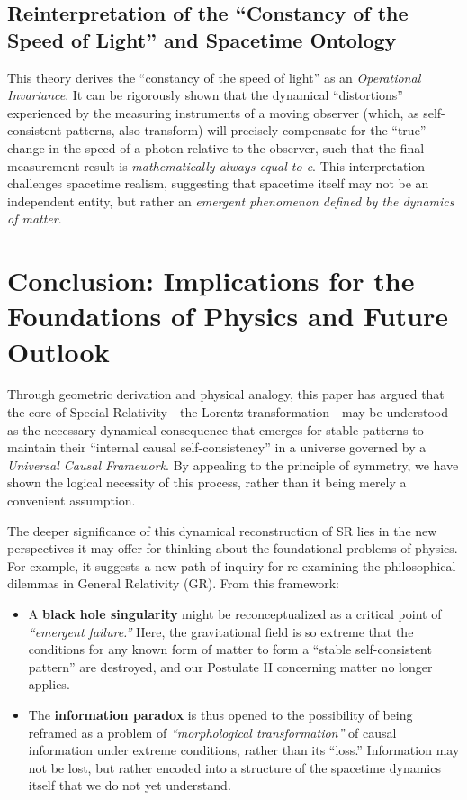 \documentclass[11pt, a4paper]{article}
\begin{document}
\subsection{Reinterpretation of the ``Constancy of the Speed of Light'' and Spacetime Ontology}
This theory derives the ``constancy of the speed of light'' as an \textit{Operational Invariance}. It can be rigorously shown that the dynamical ``distortions'' experienced by the measuring instruments of a moving observer (which, as self-consistent patterns, also transform) will precisely compensate for the ``true'' change in the speed of a photon relative to the observer, such that the final measurement result is \textit{mathematically always equal to c}. This interpretation challenges spacetime realism, suggesting that spacetime itself may not be an independent entity, but rather an \textit{emergent phenomenon defined by the dynamics of matter}.

\section{Conclusion: Implications for the Foundations of Physics and Future Outlook}

Through geometric derivation and physical analogy, this paper has argued that the core of Special Relativity—the Lorentz transformation—may be understood as the necessary dynamical consequence that emerges for stable patterns to maintain their ``internal causal self-consistency'' in a universe governed by a \textit{Universal Causal Framework}. By appealing to the principle of symmetry, we have shown the logical necessity of this process, rather than it being merely a convenient assumption.

The deeper significance of this dynamical reconstruction of SR lies in the new perspectives it may offer for thinking about the foundational problems of physics. For example, it suggests a new path of inquiry for re-examining the philosophical dilemmas in General Relativity (GR). From this framework:
\begin{itemize}
    \item A \textbf{black hole singularity} might be reconceptualized as a critical point of \textit{``emergent failure.''} Here, the gravitational field is so extreme that the conditions for any known form of matter to form a ``stable self-consistent pattern'' are destroyed, and our Postulate II concerning matter no longer applies.
    \item The \textbf{information paradox} is thus opened to the possibility of being reframed as a problem of \textit{``morphological transformation''} of causal information under extreme conditions, rather than its ``loss.'' Information may not be lost, but rather encoded into a structure of the spacetime dynamics itself that we do not yet understand.
\end{itemize}
\end{document}
